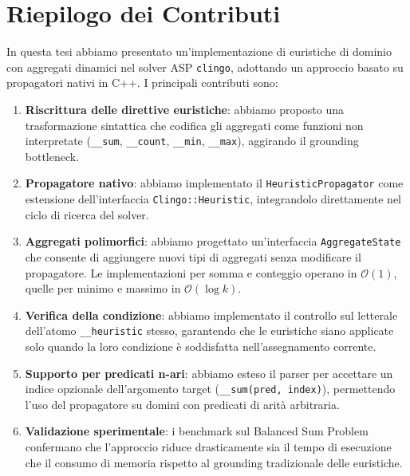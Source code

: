 \documentclass[a4paper,12pt,twoside,openright]{report}
\newcommand{\clingo}{\texttt{clingo}}
\newcommand{\hprop}{\texttt{HeuristicPropagator}}
\begin{document}
\section{Riepilogo dei Contributi}

In questa tesi abbiamo presentato un'implementazione di euristiche di dominio con aggregati dinamici nel solver ASP \clingo{}, adottando un approccio basato su propagatori nativi in C++. I principali contributi sono:

\begin{enumerate}
    \item \textbf{Riscrittura delle direttive euristiche}: abbiamo proposto una trasformazione sintattica che codifica gli aggregati come funzioni non interpretate (\texttt{\_\_sum}, \texttt{\_\_count}, \texttt{\_\_min}, \texttt{\_\_max}), aggirando il grounding bottleneck.

    \item \textbf{Propagatore nativo}: abbiamo implementato il \hprop{} come estensione dell'interfaccia \texttt{Clingo::Heuristic}, integrandolo direttamente nel ciclo di ricerca del solver.

    \item \textbf{Aggregati polimorfici}: abbiamo progettato un'interfaccia \texttt{AggregateState} che consente di aggiungere nuovi tipi di aggregati senza modificare il propagatore. Le implementazioni per somma e conteggio operano in $\mathcal{O}(1)$, quelle per minimo e massimo in $\mathcal{O}(\log k)$.

    \item \textbf{Verifica della condizione}: abbiamo implementato il controllo sul letterale dell'atomo \texttt{\_\_heuristic} stesso, garantendo che le euristiche siano applicate solo quando la loro condizione \`{e} soddisfatta nell'assegnamento corrente.

    \item \textbf{Supporto per predicati n-ari}: abbiamo esteso il parser per accettare un indice opzionale dell'argomento target (\texttt{\_\_sum(pred, index)}), permettendo l'uso del propagatore su domini con predicati di arità arbitraria.

    \item \textbf{Validazione sperimentale}: i benchmark sul Balanced Sum Problem confermano che l'approccio riduce drasticamente sia il tempo di esecuzione che il consumo di memoria rispetto al grounding tradizionale delle euristiche.
\end{enumerate}
\end{document}
